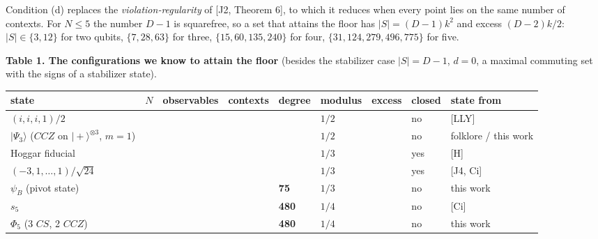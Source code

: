 \documentclass[11pt,a4paper]{article}
\begin{document}
Condition (d) replaces the \emph{violation-regularity} of {[}J2, Theorem 6{]}, to which it reduces when every
point lies on the same number of contexts. For \(N \le 5\) the number \(D - 1\) is squarefree, so a set that
attains the floor has \(|S| = (D-1)k^2\) and excess \((D-2)k/2\): \(|S| \in \{3, 12\}\) for two qubits,
\(\{7, 28, 63\}\) for three, \(\{15, 60, 135, 240\}\) for four, \(\{31, 124, 279, 496, 775\}\) for five.

\textbf{Table 1. The configurations we know to attain the floor} (besides the stabilizer case
\(|S| = D-1\), \(d = 0\), a maximal commuting set with the signs of a stabilizer state).

{\def\LTcaptype{none} %
{\footnotesize
\begin{longtable}[]{@{}>{\raggedright\arraybackslash}p{}>{\raggedright\arraybackslash}p{}>{\raggedright\arraybackslash}p{}>{\raggedright\arraybackslash}p{}>{\raggedright\arraybackslash}p{}>{\raggedright\arraybackslash}p{}>{\raggedright\arraybackslash}p{}>{\raggedright\arraybackslash}p{}>{\raggedright\arraybackslash}p{}@{}}
\toprule\noalign{}
state & \(N\) & observables & contexts & degree & modulus & excess & closed & state from \\
\midrule\noalign{}
\endhead
\bottomrule\noalign{}
\endlastfoot
\((i,i,i,1)/2\) & 2 & 12 & 8 & 0 & \(1/2\) & 2 & no & {[}LLY{]} \\
\(\vert\Psi_3\rangle\) (\(CCZ\) on \(\vert{+}\rangle^{\otimes 3}\), \(m=1\)) & 3 & 28 & 56 & 0 & \(1/2\) & 6 & no & folklore / this work \\
Hoggar fiducial & 3 & 63 & 315 & 63 & \(1/3\) & 9 & yes & {[}H{]} \\
\((-3,1,\dots,1)/\sqrt{24}\) & 4 & 135 & 1575 & 315 & \(1/3\) & 21 & yes & {[}J4, Ci{]} \\
\(\psi_B\) (pivot state) & 4 & 135 & 1095 & \textbf{75} & \(1/3\) & 21 & no & this work \\
\(s_5\) & 5 & 496 & 10880 & \textbf{480} & \(1/4\) & 60 & no & {[}Ci{]} \\
\(\Phi_5\) (3 \(CS\), 2 \(CCZ\)) & 5 & 496 & 10880 & \textbf{480} & \(1/4\) & 60 & no & this work \\

\end{longtable}}}
\end{document}
